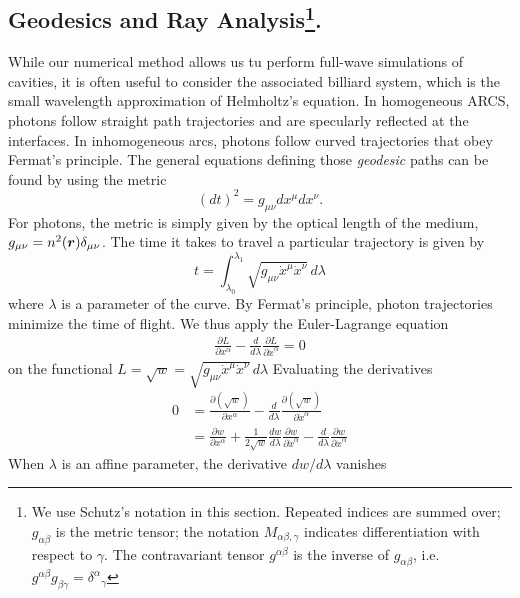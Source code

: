 \subsection{Geodesics and Ray Analysis\footnote{We use Schutz's \cite{SCH2009} notation in this section.
Repeated indices are summed over; $g_{\alpha\beta}$ is the metric tensor; the notation 
$M_{\alpha\beta,\gamma}$ indicates differentiation with respect to $\gamma$. The contravariant
tensor $g^{\alpha\beta}$ is the inverse of $g_{\alpha\beta}$, i.e. $g^{\alpha\beta}g_{\beta\gamma}={\delta^\alpha}_\gamma$}.}
While our numerical method allows us tu perform full-wave
simulations of cavities, it is often useful to consider the associated
billiard system, which is the small wavelength approximation of 
Helmholtz's equation. In homogeneous ARCS, photons follow straight path
trajectories and are specularly reflected at the interfaces. In inhomogeneous
\glspl{arc}, photons follow curved trajectories that obey Fermat's principle. 
The general equations defining those \textit{geodesic} paths can be found
by using the metric
  \begin{equation}
   (dt)^2=g_{\mu\nu}dx^\mu dx^\nu. 
  \end{equation}
For photons, the metric is simply given by the optical length 
of the medium, $g_{\mu\nu}=n^2(\boldsymbol{r})\delta_{\mu\nu}$. 
The time it takes to travel a particular trajectory is given by
  \begin{equation}
   t = \int_{\lambda_0}^{\lambda_1} \sqrt{g_{\mu\nu}\dot{x}^\mu\dot{x}^\nu}\,d\lambda
  \end{equation}
where $\lambda$ is a parameter of the curve. By Fermat's principle, photon 
trajectories minimize the time of flight. We thus apply the Euler-Lagrange
equation 
  \begin{align}
   \frac{\partial L}{\partial x^\alpha}-\frac{d}{d\lambda}\frac{\partial L}{\partial\dot{x}^\alpha}=0
  \end{align}
on the functional $L=\sqrt{w}=\sqrt{g_{\mu\nu}\dot{x}^\mu\dot{x}^\nu}\,d\lambda$ Evaluating the derivatives
  \begin{align*}
  0	&=\frac{\partial\left(\sqrt{w}\right)}{\partial x^\alpha}-\frac{d}{d\lambda}\frac{\partial\left(\sqrt{w}\right)}{\partial\dot{x}^\alpha}	\\
  {}	&=\frac{\partial w}{\partial x^\alpha}+\frac{1}{2\sqrt{w}}\frac{dw}{d\lambda}\frac{\partial w}{\partial\dot{x}^\alpha}-\frac{d}{d\lambda}\frac{\partial w}{\partial\dot{x}^\alpha}
  \end{align*}
When $\lambda$ is an affine parameter, the derivative $dw/d\lambda$ vanishes \cite{TOP2005,SCH2009}
